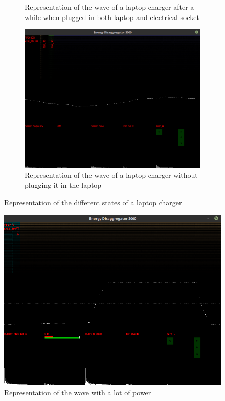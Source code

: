 \begin{figure}
\begin{subfigure}{\textwidth}
    \caption{Representation of the wave of a laptop charger after a while when plugged in both laptop and electrical socket}
    \label{fig:gui-laptop-eco}
\end{subfigure}
\begin{subfigure}{\textwidth}
    \centering
    \includegraphics[trim={0 7cm 0 7cm},clip,width=\textwidth,decodearray={1 0 1 0 1 0}]{img/gui-laptop-unplugged.png}
    \caption{Representation of the wave of a laptop charger without plugging it in the laptop}
    \label{fig:gui-laptop-unplugged}
\end{subfigure}
\caption{Representation of the different states of a laptop charger}
\label{fig:gui-laptop}
\end{figure}

\begin{figure}
    \centering
    \includegraphics[trim={0 7cm 0 7cm},clip,width=\textwidth,decodearray={1 0 1 0 1 0}]{img/gui-overflow.png}
    \caption{Representation of the wave with a lot of power}
    \label{fig:gui-overflow}
\end{figure}

